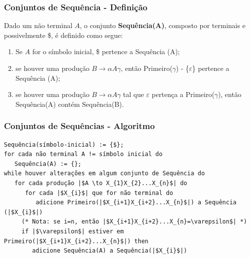 \documentclass[table]{beamer}
\begin{document}
\begin{frame}
   \frametitle{Conjuntos de Sequência - Definição}
   Dado um não terminal $A$, o conjunto \textbf{Sequência(A)}, composto por terminais e possivelmente \$, é definido como segue:
   \begin{enumerate}
      \item Se $A$ for o símbolo inicial, \$ pertence a Sequência (A);
      \item se houver uma produção $B \to \alpha A\gamma$, então Primeiro($\gamma$) - \{$\varepsilon$\} pertence a Sequência (A); 
      \item se houver uma produção $B \to \alpha A\gamma$ tal que $\varepsilon$ pertença a Primeiro($\gamma$), então Sequência(A) contém Sequência(B).
   \end{enumerate}
\end{frame}

\begin{frame}[fragile]
   \frametitle{Conjuntos de Sequências - Algoritmo}
   \begin{verbatim}
Sequência(símbolo-inicial) := {$};
for cada não terminal A != símbolo inicial do 
   Sequência(A) := {};
while houver alterações em algum conjunto de Sequência do   
   for cada produção |$A \to X_{1}X_{2}...X_{n}$| do
      for cada |$X_{i}$| que for não terminal do
         adicione Primeiro(|$X_{i+1}X_{i+2}...X_{n}$|) a Sequência (|$X_{i}$|)
	 (* Nota: se i=n, então |$X_{i+1}X_{i+2}...X_{n}=\varepsilon$| *)
	 if |$\varepsilon$| estiver em Primeiro(|$X_{i+1}X_{i+2}...X_{n}$|) then
	    adicione Sequência(A) a Sequência(|$X_{i}$|)
   \end{verbatim}
\end{frame}
\end{document}

